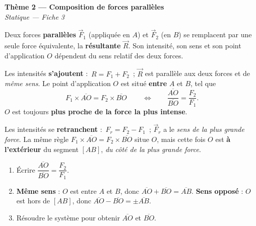 \documentclass[11pt,a4paper]{article}
\newcommand{\vv}[1]{\vec{#1}}\newcommand{\ds}{\displaystyle}
\begin{document}
\begin{center}
{\LARGE\bfseries\color{primarydark}Thème 2 — Composition de forces parallèles}\\[2pt]
{\color{primary}\itshape Statique — Fiche 3}
\end{center}
\vspace{1mm}

Deux forces \textbf{parallèles} $\vv F_1$ (appliquée en $A$) et $\vv F_2$ (en $B$) se remplacent par une
seule force équivalente, la \textbf{résultante} $\vv R$. Son intensité, son sens et son point
d'application $O$ dépendent du sens relatif des deux forces.

\begin{cle}
Les intensités \textbf{s'ajoutent} : $\boxed{\,R = F_1 + F_2\,}$ ; $\vv R$ est parallèle aux deux forces
et de \emph{même sens}. Le point d'application $O$ est situé \textbf{entre} $A$ et $B$, tel que
\[
\boxed{\,F_1\times\overline{AO} = F_2\times\overline{BO}\,}
\qquad\Longleftrightarrow\qquad
\frac{\overline{AO}}{\overline{BO}} = \frac{F_2}{F_1}.
\]
$O$ est toujours \textbf{plus proche de la force la plus intense}.
\end{cle}

\begin{cle}
Les intensités se \textbf{retranchent} : $\boxed{\,F_r = F_2 - F_1\,}$ ; $\vv F_r$ a le \emph{sens de la
plus grande force}. La même règle $F_1\times\overline{AO} = F_2\times\overline{BO}$ situe $O$, mais
cette fois $O$ est \textbf{à l'extérieur} du segment $[AB]$, \emph{du côté de la plus grande force}.
\end{cle}

\begin{methode}
\begin{enumerate}[leftmargin=1.6em,topsep=1pt,itemsep=1pt]
  \item Écrire $\dfrac{\overline{AO}}{\overline{BO}} = \dfrac{F_2}{F_1}$.
  \item \textbf{Même sens} : $O$ est entre $A$ et $B$, donc $\overline{AO}+\overline{BO}=\overline{AB}$.
        \textbf{Sens opposé} : $O$ est hors de $[AB]$, donc $\overline{AO}-\overline{BO}=\pm\overline{AB}$.
  \item Résoudre le système pour obtenir $\overline{AO}$ et $\overline{BO}$.
\end{enumerate}
\end{methode}
\end{document}
